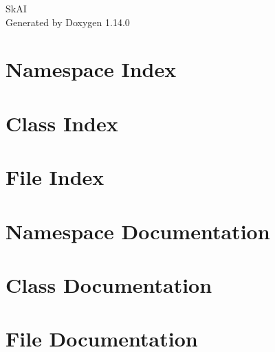 \documentclass[twoside]{book}
\newcommand{\+}{\discretionary{\mbox{\scriptsize$\hookleftarrow$}}{}{}}
\newcommand{\clearemptydoublepage}{%
    \newpage{\pagestyle{empty}\cleardoublepage}%
  }
\begin{document}
  \raggedbottom
    \hypersetup{pageanchor=false,
                bookmarksnumbered=true,
                pdfencoding=unicode
               }
  \begin{titlepage}
  \vspace*{7cm}
  \begin{center}%
  {\Large Sk\+AI}\\
  \vspace*{1cm}
  {\large Generated by Doxygen 1.14.0}\\
  \end{center}
  \end{titlepage}
  \clearemptydoublepage
  \tableofcontents
  \clearemptydoublepage
  \hypersetup{pageanchor=true}

\chapter{Namespace Index}

\chapter{Class Index}

\chapter{File Index}

\chapter{Namespace Documentation}














\chapter{Class Documentation}

\chapter{File Documentation}
























\end{document}
